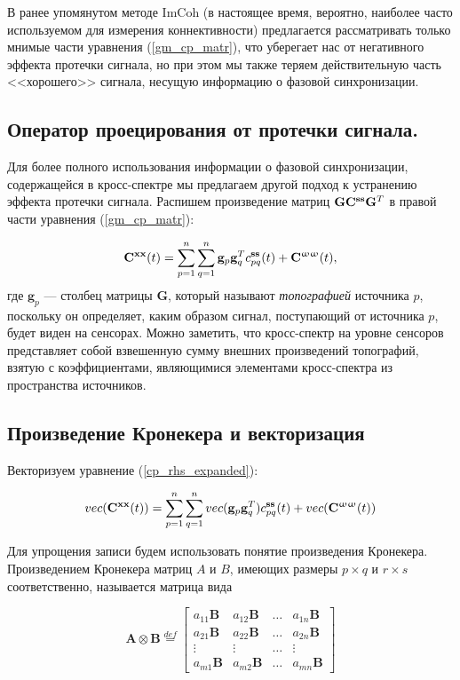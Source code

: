 В ранее упомянутом методе ImCoh (в настоящее время, вероятно,
наиболее часто используемом для измерения коннективности)
предлагается рассматривать только мнимые части уравнения (\ref{gm_cp_matr}),
что уберегает нас от негативного эффекта протечки сигнала,
но при этом мы также теряем действительную часть <<хорошего>> сигнала, несущую
информацию о фазовой синхронизации.

\subsection{Оператор проецирования от протечки сигнала.}

Для более полного использования информации о фазовой синхронизации, содержащейся в кросс-спектре
мы предлагаем другой подход к устранению эффекта протечки сигнала.
Распишем  произведение матриц $\mathbf{G} \mathbf{C}^{\mathbf{s s}} \mathbf{G}^T$ в правой части уравнения (\ref{gm_cp_matr}):

\begin{gather}
    \mathbf{C}^{\mathbf{x x}}(t) = \sum\limits_{p=1}^n\sum\limits_{q=1}^n\mathbf{g}_p\mathbf{g}_q^T c_{pq}^{\mathbf{ss}}(t) + \mathbf{C}^{\mathbf{\upomega \upomega}}(t),
    \label{cp_rhs_expanded}
\end{gather}
где $\mathbf{g}_p$ --- столбец матрицы $\mathbf{G}$, который называют \emph{топографией} источника $p$,
поскольку он определяет, каким образом сигнал, поступающий от источника $p$, будет виден на сенсорах.
Можно заметить, что кросс-спектр на уровне сенсоров представляет собой взвешенную сумму внешних произведений топографий,
взятую с коэффициентами, являющимися элементами кросс-спектра из пространства источников.

\subsection{Произведение Кронекера и векторизация}
Векторизуем уравнение (\ref{cp_rhs_expanded}):

\begin{gather}
    vec(\mathbf{C}^{\mathbf{x x}}(t)) = \sum\limits_{p=1}^n\sum\limits_{q=1}^n vec(\mathbf{g}_p\mathbf{g}_q^T) c_{pq}^{\mathbf{ss}}(t) + vec(\mathbf{C}^{\mathbf{\upomega \upomega}}(t))
    \label{cp_rhs_vec}
\end{gather}

Для упрощения записи будем использовать понятие произведения Кронекера.
Произведением Кронекера матриц $A$ и $B$, имеющих размеры $p\times q$ и $r\times s$ соответственно, называется матрица вида

\begin{equation}
    \mathbf{A} \otimes \mathbf{B} \stackrel{def}{=}
    \begin{bmatrix}
        a_{11} \mathbf{B} & a_{12} \mathbf{B} & \dots & a_{1n} \mathbf{B} \\
        a_{21} \mathbf{B} & a_{22} \mathbf{B} & \dots & a_{2n} \mathbf{B} \\
        \vdots            & \vdots            & \dots & \vdots            \\
        a_{m1} \mathbf{B} & a_{m2} \mathbf{B} & \dots & a_{mn} \mathbf{B}
        \label{kron_def}
     \end{bmatrix}
\end{equation}

